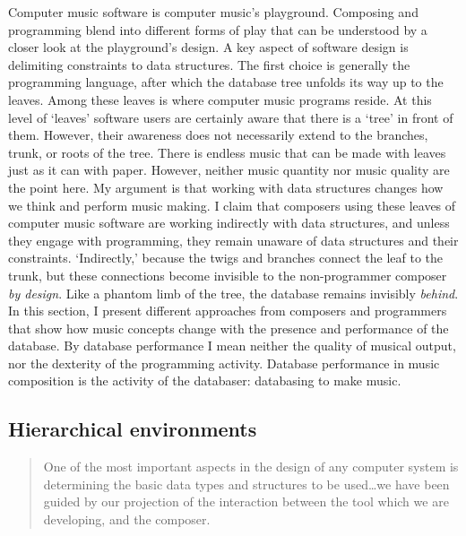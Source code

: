 Computer music software is computer music's playground. Composing and programming blend into different forms of play that can be understood by a closer look at the playground's design. A key aspect of software design is delimiting constraints to data structures. The first choice is generally the programming language, after which the database tree unfolds its way up to the leaves. Among these leaves is where computer music programs reside. At this level of `leaves' software users are certainly aware that there is a `tree' in front of them. However, their awareness does not necessarily extend to the branches, trunk, or roots of the tree. There is endless music that can be made with leaves just as it can with paper. However, neither music quantity nor music quality are the point here. My argument is that working with data structures changes how we think and perform music making. I claim that composers using these leaves of computer music software are working indirectly with data structures, and unless they engage with programming, they remain unaware of data structures and their constraints. `Indirectly,' because the twigs and branches connect the leaf to the trunk, but these connections become invisible to the non-programmer composer \textit{by design}. Like a phantom limb of the tree, the database remains invisibly \textit{behind}. In this section, I present different approaches from composers and programmers that show how music concepts change with the presence and performance of the database. By database performance I mean neither the quality of musical output, nor the dexterity of the programming activity. Database performance in music composition is the activity of the databaser: databasing to make music.


\subsection{Hierarchical environments}
\label{computer:sssp}

\begin{quote}
	One of the most important aspects in the design of any computer system is determining the basic data types and structures to be used\dots we have been guided by our projection of the interaction between the tool which we are developing, and the composer. \parencite[119]{icmc/bbp2372.1978.012}
\end{quote}

